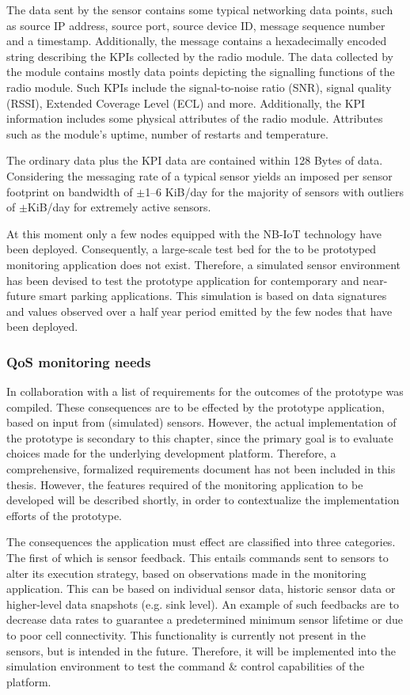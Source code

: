 The data sent by the sensor contains some typical networking data points, such as source IP address, source port, source device ID, message sequence number and a timestamp. Additionally, the message contains a hexadecimally encoded string describing the KPIs collected by the \ublox radio module. The data collected by the \ublox module contains mostly data points depicting the signalling functions of the radio module. Such KPIs include the signal-to-noise ratio (SNR), signal quality (RSSI), Extended Coverage Level (ECL) and more. Additionally, the KPI information includes some physical attributes of the radio module. Attributes such as the module's uptime, number of restarts and temperature.

The ordinary data plus the \ublox KPI data are contained within 128 Bytes of data. Considering the messaging rate of a typical sensor yields an imposed per sensor footprint on bandwidth of $\pm$1--6 KiB/day for the majority of sensors with outliers of $\pm$KiB/day for extremely active sensors.

At this moment only a few nodes equipped with the NB-IoT technology have been deployed. Consequently, a large-scale test bed for the to be prototyped monitoring application does not exist. Therefore, a simulated sensor environment has been devised to test the prototype application for contemporary and near-future smart parking applications. This simulation is based on data signatures and values observed over a half year period emitted by the few nodes that have been deployed.

\subsubsection{QoS monitoring needs}
In collaboration with \nedap\idsystems a list of requirements for the outcomes of the prototype was compiled. These consequences are to be effected by the prototype application, based on input from (simulated) sensors. However, the actual implementation of the prototype is secondary to this chapter, since the primary goal is to evaluate choices made for the underlying development platform. Therefore, a comprehensive, formalized requirements document has not been included in this thesis. However, the features required of the monitoring application to be developed will be described shortly, in order to contextualize the implementation efforts of the prototype.

The consequences the application must effect are classified into three categories. The first of which is sensor feedback. This entails commands sent to sensors to alter its execution strategy, based on observations made in the monitoring application. This can be based on individual sensor data, historic sensor data or higher-level data snapshots (e.g. sink level). An example of such feedbacks are to decrease data rates to guarantee a predetermined minimum sensor lifetime or due to poor cell connectivity. This functionality is currently not present in the \nedap sensors, but is intended in the future. Therefore, it will be implemented into the simulation environment to test the command \& control capabilities of the platform.

